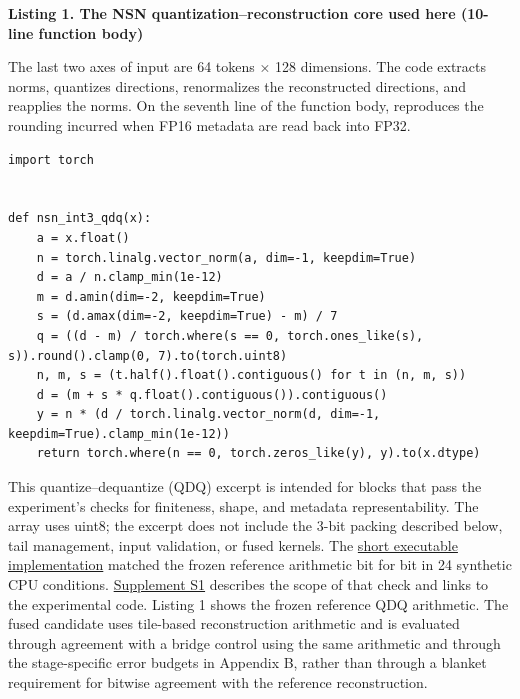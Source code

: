 \documentclass[10pt,a4paper]{article}
\begin{document}
\textbf{Listing 1. The NSN quantization--reconstruction core used here (10-line function body)}

The last two axes of input \texttt{} are 64 tokens × 128 dimensions. The code extracts norms, quantizes directions, renormalizes the reconstructed directions, and reapplies the norms. On the seventh line of the function body, \texttt{} reproduces the rounding incurred when FP16 metadata are read back into FP32.

\noindent\begin{minipage}{\linewidth}
\begin{verbatim}
import torch


def nsn_int3_qdq(x):
    a = x.float()
    n = torch.linalg.vector_norm(a, dim=-1, keepdim=True)
    d = a / n.clamp_min(1e-12)
    m = d.amin(dim=-2, keepdim=True)
    s = (d.amax(dim=-2, keepdim=True) - m) / 7
    q = ((d - m) / torch.where(s == 0, torch.ones_like(s), s)).round().clamp(0, 7).to(torch.uint8)
    n, m, s = (t.half().float().contiguous() for t in (n, m, s))
    d = (m + s * q.float().contiguous()).contiguous()
    y = n * (d / torch.linalg.vector_norm(d, dim=-1, keepdim=True).clamp_min(1e-12))
    return torch.where(n == 0, torch.zeros_like(y), y).to(x.dtype)
\end{verbatim}
\end{minipage}\par

This quantize--dequantize (QDQ) excerpt is intended for blocks that pass the experiment's checks for finiteness, shape, and metadata representability. The array \texttt{} uses uint8; the excerpt does not include the 3-bit packing described below, tail management, input validation, or fused kernels. The \href{https://github.com/metaSATOKEN/nsn/blob/c37d39ea0106274d9f661cfbb268b0ed05319846/papers/loop-kv/code/nsn_int3_core.py}{short executable implementation} matched the frozen reference arithmetic bit for bit in 24 synthetic CPU conditions. \href{https://github.com/metaSATOKEN/nsn/blob/c37d39ea0106274d9f661cfbb268b0ed05319846/papers/loop-kv/evidence-index-en-v0.3-2026-10-08.md}{Supplement S1} describes the scope of that check and links to the experimental code. Listing 1 shows the frozen reference QDQ arithmetic. The fused candidate uses tile-based reconstruction arithmetic and is evaluated through agreement with a bridge control using the same arithmetic and through the stage-specific error budgets in Appendix B, rather than through a blanket requirement for bitwise agreement with the reference reconstruction.
\end{document}
